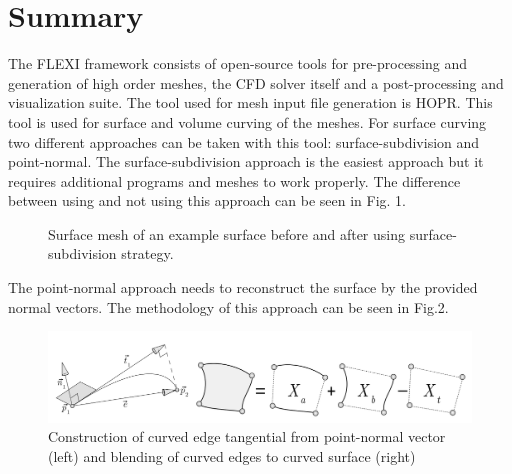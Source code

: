 \documentclass{article}
\begin{document}
\section{Summary}
The FLEXI framework consists of open-source tools for pre-processing and generation of high order meshes,
the CFD solver itself and a post-processing and visualization suite. The tool used for mesh input file generation is HOPR. This tool is used for surface and volume curving of the meshes. For surface curving two different approaches can be taken with this tool: surface-subdivision and point-normal. The surface-subdivision approach is the easiest approach but it requires additional programs and meshes to work properly. The difference between using and not using this approach can be seen in Fig. 1. 
\begin{figure}[H]
\begin{center}
\hfill
{}
    \caption{Surface mesh of an example surface before and after using surface-subdivision strategy.}
    \label{Figure1.fig}
\end{center}
    

\end{figure}
The point-normal approach needs to reconstruct the surface by the provided normal vectors. The methodology of this approach can be seen in Fig.2. 
\begin{figure}[H]
    \centering
    \includegraphics[width=1\linewidth]{figures/image_2023-10-27_035316780.png}
    \caption{Construction of curved edge tangential from point-normal vector (left) and blending of curved edges to curved surface (right)}
    \label{Figure2.fig}
\end{figure}
\end{document}
